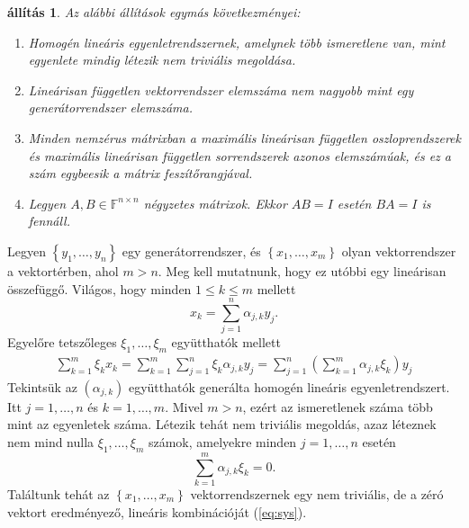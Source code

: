 \documentclass[9pt, showtrims]{memoir}
\makeatletter
\renewenvironment{proof}[1][\proofname]
    {\par\pushQED{\qed}%
    \normalfont \topsep6\p@\@plus6\p@\relax
    \trivlist
    \item[\hskip\labelsep
        \itshape
    #1\@addpunct{:}]\ignorespaces}
    {\popQED\endtrivlist\@endpefalse}
\theoremstyle{plain}
\newtheorem{proposition}{állítás}[section]
\theoremstyle{remark}
\theoremstyle{definition}
\makeatother
\begin{document}
\begin{proposition}
    Az alábbi állítások egymás következményei:
    \begin{enumerate}
        \item Homogén lineáris egyenletrendszernek, amelynek több ismeretlene van, mint egyenlete
            mindig létezik nem triviális megoldása.
        \item Lineárisan független vektorrendszer elemszáma nem nagyobb mint egy generátorrendszer elemszáma.
        \item Minden nemzérus mátrixban 
            a maximális lineárisan független oszloprendszerek 
            és maximális lineárisan független sorrendszerek azonos elemszámúak, 
            és ez a szám egybeesik a mátrix feszítőrangjával.
        \item
            Legyen $A,B\in\mathbb{F}^{n\times n}$ négyzetes mátrixok.
            Ekkor $AB=I$ esetén $BA=I$ is fennáll.\qedhere
    \end{enumerate}
\end{proposition}
\begin{proof}[1. \Rightarrow 2.]
    Legyen $\left\{ y_1,\dots,y_n \right\}$ egy generátorrendszer,
    és $\left\{ x_1,\dots,x_m \right\}$ olyan vektorrendszer a vektortérben, ahol $m>n$.
    Meg kell mutatnunk, hogy ez utóbbi egy lineárisan összefüggő.
    Világos, hogy minden $1\leq k\leq m$ mellett
    \[
        x_k=\sum_{j=1}^n\alpha_{j,k}y_j.
    \]
    Egyelőre tetszőleges $\xi_1,\dots,\xi_m$ együtthatók mellett
    \begin{eqnarray}
        \sum_{k=1}^m\xi_kx_k=
        \sum_{k=1}^m\sum_{j=1}^n\xi_k\alpha_{j,k}y_j=
        \sum_{j=1}^n\left( \sum_{k=1}^m\alpha_{j,k}\xi_k \right)y_j
        \label{eq:sys}
    \end{eqnarray}
    Tekintsük az $\left( \alpha_{j,k} \right)$ együtthatók generálta
    homogén lineáris egyenletrendszert. 
    Itt $j=1,\dots,n$ és $k=1,\dots,m$.
    Mivel $m>n$, ezért az ismeretlenek száma több mint az egyenletek száma.
    Létezik tehát nem triviális megoldás, azaz léteznek nem mind nulla
    $\xi_1,\dots,\xi_m$ számok, amelyekre minden $j=1,\dots,n$ esetén
    \[
        \sum_{k=1}^m\alpha_{j,k}\xi_k=0.
    \]
    Találtunk tehát az $\left\{ x_1,\dots,x_m \right\}$ vektorrendszernek egy
    nem triviális, 
    de a zéró vektort eredményező,
    lineáris kombinációját (\ref{eq:sys}).
\end{proof}
\end{document}

